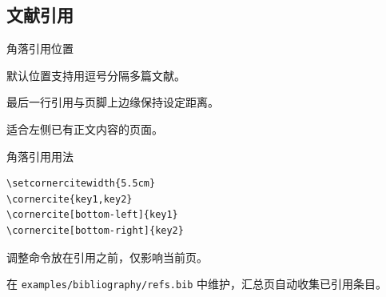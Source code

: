 \subsection{文献引用}

\begin{frame}{角落引用位置}
      \setcornercitewidth{5.5cm} %
      \begin{description}[右上]
            \item[右上] 默认位置支持用逗号分隔多篇文献。
            \item[左下] 最后一行引用与页脚上边缘保持设定距离。
            \item[右下] 适合左侧已有正文内容的页面。
      \end{description}

\end{frame}

\begin{frame}[fragile]{角落引用用法}
      \begin{verbatim}
\setcornercitewidth{5.5cm}
\cornercite{key1,key2}
\cornercite[bottom-left]{key1}
\cornercite[bottom-right]{key2}
      \end{verbatim}
      \begin{description}[引用宽度]
            \item[引用宽度] 调整命令放在引用之前，仅影响当前页。
            \item[文献信息] 在 \texttt{examples/bibliography/refs.bib} 中维护，汇总页自动收集已引用条目。
      \end{description}
\end{frame}



